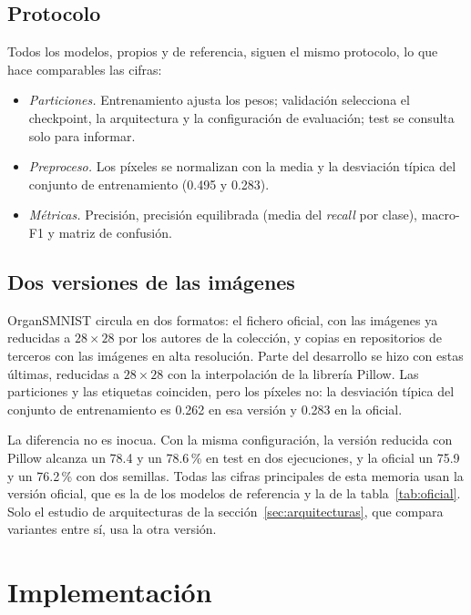 \documentclass[11pt,a4paper]{article}
\begin{document}
\subsection{Protocolo}

Todos los modelos, propios y de referencia, siguen el mismo protocolo, lo que
hace comparables las cifras:

\begin{itemize}
  \item \emph{Particiones.} Entrenamiento ajusta los pesos; validación
        selecciona el checkpoint, la arquitectura y la configuración de
        evaluación; test se consulta solo para informar.
  \item \emph{Preproceso.} Los píxeles se normalizan con la media y la
        desviación típica del conjunto de entrenamiento (0.495 y 0.283).
  \item \emph{Métricas.} Precisión, precisión equilibrada (media del
        \emph{recall} por clase), macro-F1 y matriz de confusión.
\end{itemize}

\subsection{Dos versiones de las imágenes}
\label{sec:versiones}

OrganSMNIST circula en dos formatos: el fichero oficial, con las imágenes ya
reducidas a $28\times28$ por los autores de la colección, y copias en
repositorios de terceros con las imágenes en alta resolución. Parte del
desarrollo se hizo con estas últimas, reducidas a $28\times28$ con la
interpolación de la librería Pillow. Las particiones y las etiquetas coinciden,
pero los píxeles no: la desviación típica del conjunto de entrenamiento es 0.262
en esa versión y 0.283 en la oficial.

La diferencia no es inocua. Con la misma configuración, la versión reducida con
Pillow alcanza un 78.4 y un 78.6\,\% en test en dos ejecuciones, y la oficial un
75.9 y un 76.2\,\% con dos semillas. Todas las cifras principales de esta
memoria usan la versión oficial, que es la de los modelos de referencia y la de
la tabla~\ref{tab:oficial}. Solo el estudio de arquitecturas de la
sección~\ref{sec:arquitecturas}, que compara variantes entre sí, usa la otra
versión.

\section{Implementación}
\end{document}
